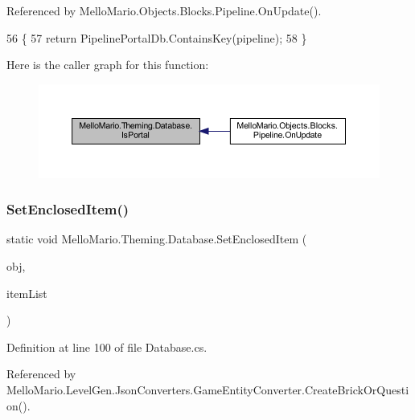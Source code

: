 Referenced by Mello\+Mario.\+Objects.\+Blocks.\+Pipeline.\+On\+Update().


\begin{DoxyCode}
56         \{
57             \textcolor{keywordflow}{return} PipelinePortalDb.ContainsKey(pipeline);
58         \}
\end{DoxyCode}
Here is the caller graph for this function\+:
\nopagebreak
\begin{figure}[H]
\begin{center}
\leavevmode
\includegraphics[width=350pt]{classMelloMario_1_1Theming_1_1Database_abb6dce685c8a34a586fa4c8fc41fff87_icgraph}
\end{center}
\end{figure}
\mbox{\label{classMelloMario_1_1Theming_1_1Database_abc8cd8416d5c045bd7bb18fc66363465}} 
\subsubsection{Set\+Enclosed\+Item()}
{\footnotesize\ttfamily static void Mello\+Mario.\+Theming.\+Database.\+Set\+Enclosed\+Item (\begin{DoxyParamCaption}\item[{\textbf{ I\+Game\+Object}}]{obj,  }\item[{I\+List$<$ \textbf{ I\+Game\+Object} $>$}]{item\+List }\end{DoxyParamCaption})\hspace{0.3cm}{\ttfamily [static]}}



Definition at line 100 of file Database.\+cs.



Referenced by Mello\+Mario.\+Level\+Gen.\+Json\+Converters.\+Game\+Entity\+Converter.\+Create\+Brick\+Or\+Question().


